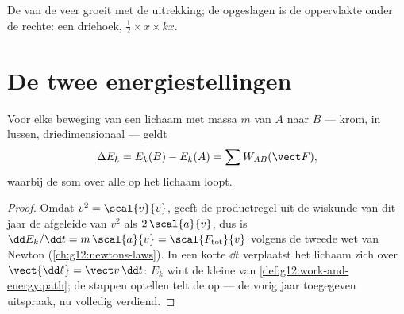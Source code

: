 \begin{omfigure}

{\small De  van de veer groeit met de uitrekking; de opgeslagen 
is de oppervlakte onder de rechte: een driehoek,
$\tfrac12 \times x \times kx$.}
\end{omfigure}

\section{De twee energiestellingen}

\begin{theorem}\label{thm:g12:work-and-energy:ketheorem}
Voor elke beweging van een lichaam met massa $m$ van $A$ naar $B$ --- krom,
in lussen, driedimensionaal --- geldt
\[
\Delta E_k = E_k(B) - E_k(A) = \sum W_{AB}(\vect F),
\]
waarbij de som over alle  op het lichaam loopt.
\end{theorem}

\begin{proof}
Omdat $v^2 = \scal{v}{v}$, geeft de productregel uit de wiskunde van dit jaar
de afgeleide van $v^2$ als $2\,\scal{a}{v}$, dus is
$\dd E_k/\dd t = m\,\scal{a}{v} = \scal{F_{\text{tot}}}{v}$ volgens de tweede
wet van Newton (\cref{ch:g12:newtons-laws}). In een korte $\dd t$ verplaatst
het lichaam zich over $\vect{\dd\ell} = \vect v\,\dd t$: $E_k$ wint de kleine
 van \cref{def:g12:work-and-energy:path}; de stappen optellen telt de
 op --- de vorig jaar toegegeven uitspraak, nu volledig verdiend.
\end{proof}

